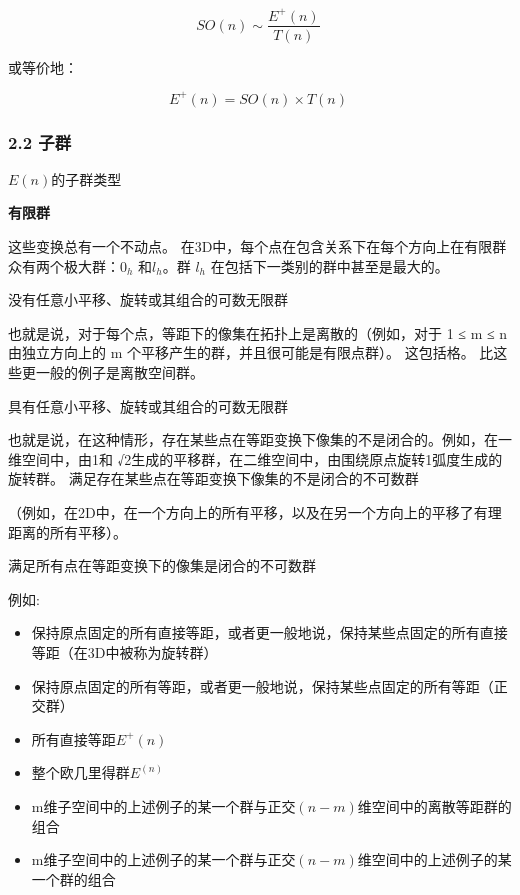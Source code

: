 \begin{equation}
SO(n) \sim \frac{E^{+}(n)}{T(n)}~
\end{equation}

或等价地：

\begin{equation}
E^{+}(n) = SO(n) \times T(n)~
\end{equation}



\subsubsection{2.2 子群}

$E(n)$的子群类型

\textbf{有限群}

这些变换总有一个不动点。 在3D中，每个点在包含关系下在每个方向上在有限群众有两个极大群：$0_h$ 和$l_h$。群 $l_h$ 在包括下一类别的群中甚至是最大的。

没有任意小平移、旋转或其组合的可数无限群

也就是说，对于每个点，等距下的像集在拓扑上是离散的（例如，对于 1 ≤ m ≤ n 由独立方向上的 m 个平移产生的群，并且很可能是有限点群）。 这包括格。 比这些更一般的例子是离散空间群。

具有任意小平移、旋转或其组合的可数无限群

也就是说，在这种情形，存在某些点在等距变换下像集的不是闭合的。例如，在一维空间中，由1和 √2生成的平移群，在二维空间中，由围绕原点旋转1弧度生成的旋转群。
满足存在某些点在等距变换下像集的不是闭合的不可数群

（例如，在2D中，在一个方向上的所有平移，以及在另一个方向上的平移了有理距离的所有平移）。

满足所有点在等距变换下的像集是闭合的不可数群

例如:

\begin{itemize}
\item 保持原点固定的所有直接等距，或者更一般地说，保持某些点固定的所有直接等距（在3D中被称为旋转群）
\item 保持原点固定的所有等距，或者更一般地说，保持某些点固定的所有等距（正交群）
\item 所有直接等距$E^+(n)$
\item 整个欧几里得群$E^(n)$
\item m维子空间中的上述例子的某一个群与正交$(n-m)$维空间中的离散等距群的组合
\item m维子空间中的上述例子的某一个群与正交$(n-m)$维空间中的上述例子的某一个群的组合
\end{itemize}

